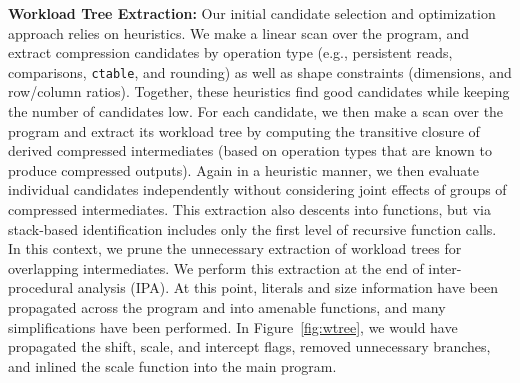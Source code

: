 \textbf{Workload Tree Extraction:}
Our initial candidate selection and optimization approach relies on heuristics.
We make a linear scan over the program, and extract compression candidates by operation type (e.g., persistent reads, comparisons, \texttt{ctable}, and rounding) as well as shape constraints (dimensions, and row/column ratios).
Together, these heuristics find good candidates while keeping the number of candidates low.
For each candidate, we then make a scan over the program and extract its workload tree by computing the transitive closure of derived compressed intermediates (based on operation types that are known to produce compressed outputs).
Again in a heuristic manner, we then evaluate individual candidates independently without considering joint effects of groups of compressed intermediates.
This extraction also descents into functions, but via stack-based identification includes only the first level of recursive function calls.
In this context, we prune the unnecessary extraction of workload trees for overlapping intermediates.
We perform this extraction at the end of inter-procedural analysis (IPA).
At this point, literals and size information have been propagated across the program and into amenable functions, and many simplifications have been performed.
In Figure~\ref{fig:wtree}, we would have propagated the shift, scale, and intercept flags, removed unnecessary branches, and inlined the scale function into the main program.

